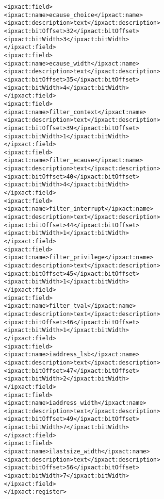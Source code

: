 \begin{alltt}
               <ipxact:field>
                  <ipxact:name>ecause_choice</ipxact:name>
                  <ipxact:description>text</ipxact:description>
                  <ipxact:bitOffset>32</ipxact:bitOffset>
                  <ipxact:bitWidth>3</ipxact:bitWidth>
               </ipxact:field>
               <ipxact:field>
                  <ipxact:name>ecause_width</ipxact:name>
                  <ipxact:description>text</ipxact:description>
                  <ipxact:bitOffset>35</ipxact:bitOffset>
                  <ipxact:bitWidth>4</ipxact:bitWidth>
               </ipxact:field>
               <ipxact:field>
                  <ipxact:name>filter_context</ipxact:name>
                  <ipxact:description>text</ipxact:description>
                  <ipxact:bitOffset>39</ipxact:bitOffset>
                  <ipxact:bitWidth>1</ipxact:bitWidth>
               </ipxact:field>
               <ipxact:field>
                  <ipxact:name>filter_ecause</ipxact:name>
                  <ipxact:description>text</ipxact:description>
                  <ipxact:bitOffset>40</ipxact:bitOffset>
                  <ipxact:bitWidth>4</ipxact:bitWidth>
               </ipxact:field>
               <ipxact:field>
                  <ipxact:name>filter_interrupt</ipxact:name>
                  <ipxact:description>text</ipxact:description>
                  <ipxact:bitOffset>44</ipxact:bitOffset>
                  <ipxact:bitWidth>1</ipxact:bitWidth>
               </ipxact:field>
               <ipxact:field>
                  <ipxact:name>filter_privilege</ipxact:name>
                  <ipxact:description>text</ipxact:description>
                  <ipxact:bitOffset>45</ipxact:bitOffset>
                  <ipxact:bitWidth>1</ipxact:bitWidth>
               </ipxact:field>
               <ipxact:field>
                  <ipxact:name>filter_tval</ipxact:name>
                  <ipxact:description>text</ipxact:description>
                  <ipxact:bitOffset>46</ipxact:bitOffset>
                  <ipxact:bitWidth>1</ipxact:bitWidth>
               </ipxact:field>
               <ipxact:field>
                  <ipxact:name>iaddress_lsb</ipxact:name>
                  <ipxact:description>text</ipxact:description>
                  <ipxact:bitOffset>47</ipxact:bitOffset>
                  <ipxact:bitWidth>2</ipxact:bitWidth>
               </ipxact:field>
               <ipxact:field>
                  <ipxact:name>iaddress_width</ipxact:name>
                  <ipxact:description>text</ipxact:description>
                  <ipxact:bitOffset>49</ipxact:bitOffset>
                  <ipxact:bitWidth>7</ipxact:bitWidth>
               </ipxact:field>
               <ipxact:field>
                  <ipxact:name>ilastsize_width</ipxact:name>
                  <ipxact:description>text</ipxact:description>
                  <ipxact:bitOffset>56</ipxact:bitOffset>
                  <ipxact:bitWidth>7</ipxact:bitWidth>
               </ipxact:field>
            </ipxact:register>



\end{alltt}
